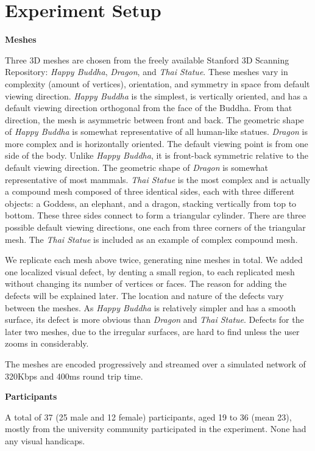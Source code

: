 \section{Experiment Setup}
\label{s:user:study}
\textbf{Meshes}

Three 3D meshes are chosen from the freely available
Stanford 3D Scanning Repository:   %
\textit{Happy Buddha}, \textit{Dragon}, and \textit{Thai Statue}.
These meshes vary in complexity (amount of vertices), orientation, and
symmetry in space from default viewing direction. \textit{Happy Buddha} is the
simplest, is vertically oriented, and has a default viewing direction
orthogonal from the face of the Buddha. From that direction, the mesh is
asymmetric between front and back. The geometric shape of \textit{Happy Buddha} is
somewhat representative of all human-like statues. \textit{Dragon} is more complex
and is horizontally oriented. The default viewing point is from one
side of the body. Unlike \textit{Happy Buddha}, it is front-back symmetric
relative to the default viewing direction. The geometric shape of \textit{Dragon} is
somewhat representative of most mammals. \textit{Thai Statue} is the most complex
and is actually a compound mesh composed of three identical sides, each 
with three different objects: a Goddess, an elephant, and a dragon,
stacking vertically from top to bottom.  These three sides connect to
form a triangular cylinder. There are three possible default
viewing directions, one each from three corners of the triangular mesh. The
\textit{Thai Statue} is included as an example of complex compound mesh.

We replicate each mesh above twice, generating nine meshes in total.  
We added one localized visual defect, by denting a small region, to each replicated mesh 
without changing its number of vertices or faces. The reason for adding the defects will be explained later. 
The location and nature of the
defects vary between the meshes. As \textit{Happy Buddha} is
relatively simpler and has a smooth surface, its defect is
 more obvious than \textit{Dragon}
and \textit{Thai Statue}.  Defects for the later two meshes, due to the
irregular surfaces, are hard to find unless the user zooms in
considerably.

The meshes are encoded progressively and streamed over a simulated network of 320Kbps and 400ms round trip time.  

\textbf{Participants}

A total of 37 (25 male and 12 female) participants, aged 19 to 36
(mean 23), mostly from the university community participated in the
experiment. None had any visual handicaps.

